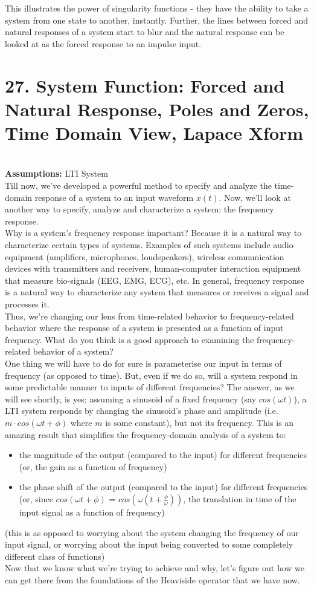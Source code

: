 \documentclass{report}
\begin{document}
This illustrates the power of singularity functions - they have the ability to take a system from one state to another, instantly. Further, the lines between forced and natural responses of a system start to blur and the natural response can be looked at as the forced response to an impulse input.

\section{27. System Function: Forced and Natural Response, Poles and Zeros, Time Domain View, Lapace Xform} \\
\textbf{Assumptions:} LTI System \smallskip \\
Till now, we've developed a powerful method to specify and analyze the time-domain response of a system to an input waveform $x(t)$. Now, we'll look at another way to specify, analyze and characterize a system: the frequency response. \smallskip \\
Why is a system's frequency response important? Because it is a natural way to characterize certain types of systems. Examples of such systems include audio equipment (amplifiers, microphones, loudspeakers), wireless communication devices with transmitters and receivers, human-computer interaction equipment that measure bio-signals (EEG, EMG, ECG), etc. In general, frequency response is a natural way to characterize any system that measures or receives a signal and processes it.\smallskip \\
Thus, we're changing our lens from time-related behavior to frequency-related behavior where the response of a system is presented as a function of input frequency. What do you think is a good approach to examining the frequency-related behavior of a system? \smallskip \\ 
One thing we will have to do for sure is parameterise our input in terms of frequency (as opposed to time). But, even if we do so, will a system respond in some predictable manner to inputs of different frequencies? The answer, as we will see shortly, is yes; assuming a sinusoid of a fixed frequency (say $cos(\omega t)$), a LTI system responds by changing the sinusoid's phase and amplitude (i.e. $m \cdot cos(\omega t + \phi)$ where $m$ is some constant), but not its frequency. This is an amazing result that simplifies the frequency-domain analysis of a system to:
\begin{itemize}
    \item the magnitude of the output (compared to the input) for different frequencies (or, the gain as a function of frequency)
    \item the phase shift of the output (compared to the input) for different frequencies (or, since $cos(\omega t + \phi)$ = $cos(\omega(t + \tfrac{\phi}{\omega}))$, the translation in time of the input signal as a function of frequency)
\end{itemize}
(this is as opposed to worrying about the system changing the frequency of our input signal, or worrying about the input being converted to some completely different class of functions) \\
Now that we know what we're trying to achieve and why, let's figure out how we can get there from the foundations of the Heaviside operator that we have now. 
\end{document}
